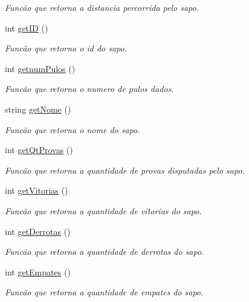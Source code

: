\begin{DoxyCompactItemize}
\begin{DoxyCompactList}\small\item\em Funcão que retorna a distancia percorrida pelo sapo. \end{DoxyCompactList}\item 
int \hyperlink{classsapo_afc5c0ac044a3003637581760195157c8}{get\+ID} ()
\begin{DoxyCompactList}\small\item\em Funcão que retorna o id do sapo. \end{DoxyCompactList}\item 
int \hyperlink{classsapo_a6dada85a935ea0d3ad7f32431a740023}{getnum\+Pulos} ()
\begin{DoxyCompactList}\small\item\em Funcão que retorna o numero de pulos dados. \end{DoxyCompactList}\item 
string \hyperlink{classsapo_a00d67b541b25691586317d6e4a0c7253}{get\+Nome} ()
\begin{DoxyCompactList}\small\item\em Funcão que retorna o nome do sapo. \end{DoxyCompactList}\item 
int \hyperlink{classsapo_a47d19c466d3b4f3269dc251810d10a2b}{get\+Qt\+Provas} ()
\begin{DoxyCompactList}\small\item\em Funcão que retorna a quantidade de provas disputadas pelo sapo. \end{DoxyCompactList}\item 
int \hyperlink{classsapo_a6822cc8695906aa004021719004595bd}{get\+Vitorias} ()
\begin{DoxyCompactList}\small\item\em Funcão que retorna a quantidade de vitorias do sapo. \end{DoxyCompactList}\item 
int \hyperlink{classsapo_a73e6795162097a7c113e7f37a8e21afa}{get\+Derrotas} ()
\begin{DoxyCompactList}\small\item\em Funcão que retorna a quantidade de derrotas do sapo. \end{DoxyCompactList}\item 
int \hyperlink{classsapo_a558c4509917b0075c7e0135f9ded8857}{get\+Empates} ()
\begin{DoxyCompactList}\small\item\em Funcão que retorna a quantidade de empates do sapo. \end{DoxyCompactList}\item 

\end{DoxyCompactItemize}
